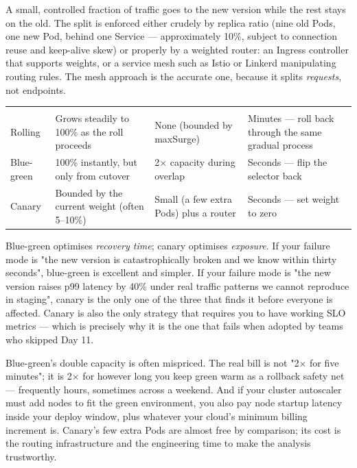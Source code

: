  A small, controlled fraction of traffic goes to the new version while the rest stays on the old. The split is enforced either crudely by replica ratio (nine old Pods, one new Pod, behind one Service --- approximately 10\%, subject to connection reuse and keep-alive skew) or properly by a weighted router: an Ingress controller that supports weights, or a service mesh such as Istio or Linkerd manipulating routing rules. The mesh approach is the accurate one, because it splits \emph{requests}, not endpoints.

\begin{center}\small
\wbrowcolors
\begin{tabularx}{\linewidth}{@{}L{22mm} X L{25mm} L{20mm}@{}}
 &  &  & \\
Rolling & Grows steadily to 100\% as the roll proceeds & None (bounded by maxSurge) & Minutes --- roll back through the same gradual process\\
Blue-green & 100\% instantly, but only from cutover & 2$\times$ capacity during overlap & Seconds --- flip the selector back\\
Canary & Bounded by the current weight (often 5--10\%) & Small (a few extra Pods) plus a router & Seconds --- set weight to zero\\
\end{tabularx}
\end{center}

\begin{tradeoff}
Blue-green optimises \emph{recovery time}; canary optimises \emph{exposure}. If your failure mode is "the new version is catastrophically broken and we know within thirty seconds", blue-green is excellent and simpler. If your failure mode is "the new version raises p99 latency by 40\% under real traffic patterns we cannot reproduce in staging", canary is the only one of the three that finds it before everyone is affected. Canary is also the only strategy that requires you to have working SLO metrics --- which is precisely why it is the one that fails when adopted by teams who skipped Day 11.
\end{tradeoff}

\begin{costnote}
Blue-green's double capacity is often mispriced. The real bill is not "2$\times$ for five minutes"; it is 2$\times$ for however long you keep green warm as a rollback safety net --- frequently hours, sometimes across a weekend. And if your cluster autoscaler must add nodes to fit the green environment, you also pay node startup latency inside your deploy window, plus whatever your cloud's minimum billing increment is. Canary's few extra Pods are almost free by comparison; its cost is the routing infrastructure and the engineering time to make the analysis trustworthy.
\end{costnote}

